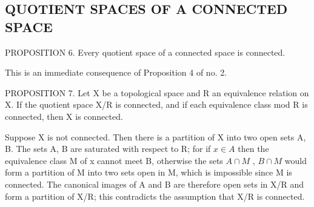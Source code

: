 \subsection{QUOTIENT SPACES OF A CONNECTED SPACE}

PROPOSITION 6. Every quotient space of a connected space is connected.

This is an immediate consequence of Proposition 4 of no. 2.

PROPOSITION 7. Let X be a topological space and R an equivalence relation on X. If the quotient space X/R is connected, and if each equivalence class mod R is connected, then X is connected.

Suppose X is not connected. Then there is a partition of X into two open sets A, B. The sets A, B are saturated with respect to R; for if \(x \in A\) then the equivalence class M of x cannot meet B, otherwise the sets \(A \cap M\) , \(B \cap M\) would form a partition of M into two sets open in M, which is impossible since M is connected. The canonical images of A and B are therefore open sets in X/R and form a partition of X/R; this contradicts the assumption that X/R is connected.

